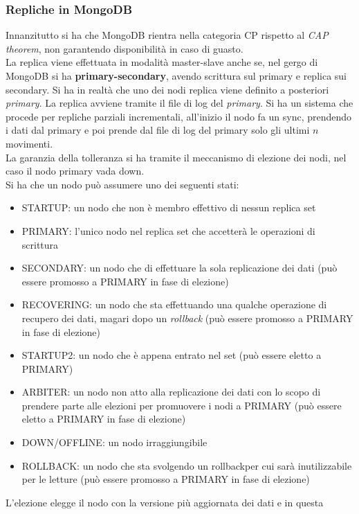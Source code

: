 \documentclass[a4paper,12pt, oneside]{book}
\begin{document}
\subsubsection{Repliche in MongoDB}
Innanzitutto si ha che MongoDB rientra nella categoria CP rispetto al
\textit{CAP theorem}, non garantendo disponibilità in caso di guasto.\\
La replica viene effettuata in modalità master-slave anche se, nel gergo di
MongoDB si ha \textbf{primary-secondary}, avendo scrittura sul primary e replica
sui secondary. Si ha in realtà che uno dei nodi replica viene definito a
posteriori \textit{primary}. La replica avviene tramite il file di log del
\textit{primary}. Si ha un sistema che procede per repliche parziali
incrementali, all'inizio il nodo fa un sync, prendendo i dati dal primary e poi
prende dal file di log del primary solo gli ultimi $n$ movimenti.\\
La garanzia della tolleranza si ha tramite il meccanismo di elezione dei nodi,
nel caso il nodo primary vada down.\\
Si ha che un nodo può assumere uno dei seguenti stati:
\begin{itemize}
  \item STARTUP: un nodo che non è membro effettivo di nessun replica set
  \item PRIMARY: l’unico nodo nel replica set che accetterà le operazioni di
  scrittura
  \item SECONDARY: un nodo che di effettuare la sola replicazione dei dati (può
  essere promosso a PRIMARY in fase di elezione)
  \item RECOVERING: un nodo che sta effettuando una qualche operazione di
  recupero dei dati, magari dopo un \textit{rollback} (può essere promosso a
  PRIMARY in fase di elezione) 
  \item STARTUP2: un nodo che è appena entrato nel set (può essere eletto a
  PRIMARY)
  \item ARBITER: un nodo non atto alla replicazione dei dati con lo scopo di
  prendere parte alle elezioni per promuovere i nodi a PRIMARY (può essere
  eletto a PRIMARY in fase di elezione)
  \item DOWN/OFFLINE: un nodo irraggiungibile
  \item ROLLBACK: un nodo che sta svolgendo un rollbackper cui sarà
  inutilizzabile per le letture (può essere promosso a PRIMARY in fase di
  elezione)  
\end{itemize}
L'elezione elegge il nodo con la versione più aggiornata dei dati e in questa
\end{document}
